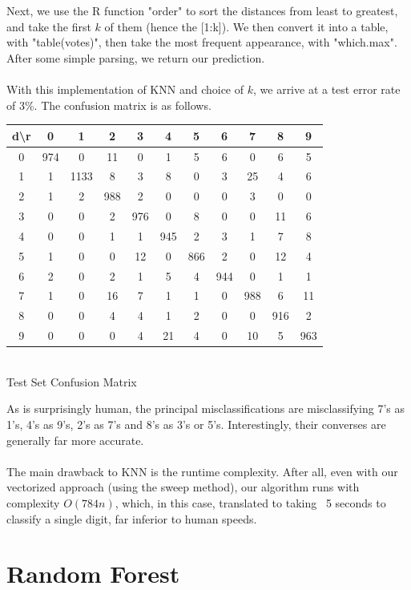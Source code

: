 \documentclass[10pt]{extarticle}
\begin{document}
Next, we use the R function "order" to sort the distances from least to greatest, and take the first $k$ of them (hence the [1:k]). We then convert it into a table, with "table(votes)", then take the most frequent appearance, with "which.max". After some simple parsing, we return our prediction. \\\\
With this implementation of KNN and choice of $k$, we arrive at a test error rate of 3\%. The confusion matrix is as follows.
\begin{center}
\begin{minipage}{.6\textwidth}
	\begin{center}
	\begin{tabular}{c | c c c c c c c c c c}
	d\textbackslash r&0&1&2&3&4&5&6&7&8&9\\ \hline
	0& 974 & 0 & 11 & 0 & 1 & 5 & 6 & 0 & 6 & 5\\
	1&1&1133&8&3&8&0&3&25&4&6\\
	2& 1 & 2 & 988 & 2 & 0 & 0 & 0 & 3 & 0 & 0\\
	3& 0 & 0 & 2 & 976 & 0 & 8 & 0 & 0 & 11 & 6\\
	4& 0 & 0 & 1 & 1 & 945 & 2 & 3 & 1 & 7 & 8\\
	5& 1 & 0 & 0 & 12 & 0 & 866 & 2 & 0 & 12 & 4\\
	6& 2 & 0 & 2 & 1 & 5 & 4 & 944 & 0 & 1 & 1\\
	7& 1 & 0 & 16 & 7 & 1 & 1 & 0 & 988 & 6 & 11\\
	8& 0 & 0 & 4 & 4 & 1 & 2 & 0 & 0 & 916 & 2\\
	9& 0 & 0 & 0 & 4 & 21 & 4 & 0 & 10 & 5 & 963
	\end{tabular}\\
	\bigskip
	Test Set Confusion Matrix
	\end{center}
	\textrm{ }
\end{minipage}
\end{center}
As is surprisingly human, the principal misclassifications are misclassifying 7's as 1's, 4's as 9's, 2's as 7's and 8's as 3's or 5's. Interestingly, their converses are generally far more accurate. \\\\
The main drawback to KNN is the runtime complexity. After all, even with our vectorized approach (using the sweep method), our algorithm runs with complexity $O(784n)$, which, in this case, translated to taking ~5 seconds to classify a single digit, far inferior to human speeds. 


\section{Random Forest}
\end{document}
